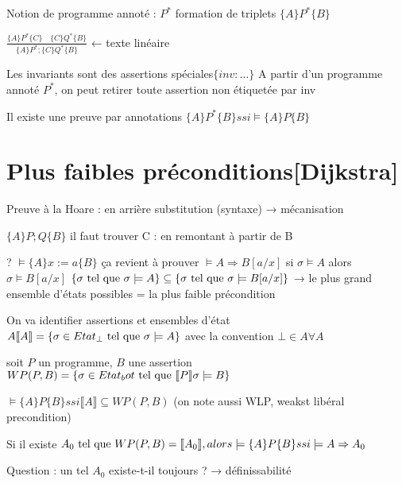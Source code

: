 \documentclass[10pt,a4paper]{article}
\newcommand{\semm}[1]{\llbracket #1 \rrbracket }
\newcommand{\semh}[3]{\{#1\}#2\{#3\}}
\begin{document}
Notion de programme annoté : $P^*$
formation de triplets $\semh{A}{P^*}{B}$
\begin{ex}
 $\frac{\semh{A}{P^*}{C} \quad \semh{C}{Q^*}{B}}{\semh{A}{P^*;\{C\} Q^*}{B}}$ ← texte linéaire
\end{ex}
Les invariants sont des assertions spéciales$ \{inv: \dots \}$
A partir d'un programme annoté $P^*$, on peut retirer toute assertion non étiquetée par inv

\begin{thm}
 Il existe une preuve par annotations $\semh{A}{P^*}{B} ssi \models \semh{A}{P}{B}$
\end{thm}


\section{Plus faibles préconditions[Dijkstra]}

Preuve à la Hoare : en arrière
		    substitution (syntaxe)
	→ mécanisation 

$\semh{A}{P;Q}{B}$ il faut trouver C : en remontant à partir de B

? $\models \semh{A}{x:=a}{B}$ ça revient à prouver $\models A \Rightarrow B[a/x]$
					      si $\sigma \models A$ alors $\sigma \models B[a/x]$
					     $ \{\sigma \text{ tel que } \sigma \models A \} \subseteq \{\sigma \text{ tel que } \sigma \models B[a /x]\}$
→ le plus grand ensemble d'états possibles = la plus faible précondition

On va identifier assertions et ensembles d'état
		 $   A          \semm{A} = \{\sigma \in Etat_\bot \tq \sigma \models A \}$
				    avec la convention $\bot \in A \forall A$

\begin{definition}
 soit $P$ un programme, $B$ une assertion
 $WP(P,B) = \{ \sigma \in Etat_bot \tq \semm{P} \sigma \models B \}$
\end{definition}

\begin{prop}
 $\models \semh{A}{P}{B} ssi \semm{A} \subseteq WP(P,B)$ (on note aussi WLP, weakst libéral precondition)
\end{prop}

\begin{cor}
 Si il existe $A_0 \tq WP(P,B) = \semm{A_0}, alors \models \semh{A}{P}{B} ssi \models A \Rightarrow A_0$
\end{cor}

Question : un tel $A_0$ existe-t-il toujours ? → définissabilité
\end{document}
